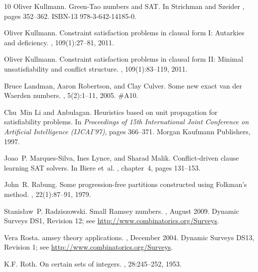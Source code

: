 \documentclass[final,3p,times]{elsarticle}
\theoremstyle{definition}
\begin{document}
\begin{thebibliography}{10}
Oliver Kullmann.
\newblock Green-{T}ao numbers and {SAT}.
\newblock In Strichman and Szeider \cite{Edinburgh2010}, pages 352--362.
\newblock ISBN-13 978-3-642-14185-0.

Oliver Kullmann.
\newblock Constraint satisfaction problems in clausal form {I}: Autarkies and
  deficiency.
, 109(1):27--81, 2011.

Oliver Kullmann.
\newblock Constraint satisfaction problems in clausal form {II}: Minimal
  unsatisfiability and conflict structure.
, 109(1):83--119, 2011.

Bruce Landman, Aaron Robertson, and Clay Culver.
\newblock Some new exact van der {Waerden} numbers.
,
  5(2):1--11, 2005.
\newblock \#{}A10.

Chu~Min Li and Anbulagan.
\newblock Heuristics based on unit propagation for satisfiability problems.
\newblock In {\em Proceedings of 15th International Joint Conference on
  Artificial Intelligence (IJCAI'97)}, pages 366--371. Morgan Kaufmann
  Publishers, 1997.

Joao~P. Marques-Silva, Ines Lynce, and Sharad Malik.
\newblock Conflict-driven clause learning {SAT} solvers.
\newblock In Biere et~al. \cite{2008HandbuchSAT}, chapter~4, pages 131--153.

John~R. Rabung.
\newblock Some progression-free partitions constructed using {F}olkman's
  method.
, 22(1):87--91, 1979.

Stanis{\l}aw~P. Radziszowski.
\newblock Small {R}amsey numbers.
, August 2009.
\newblock Dynamic Surveys DS1, Revision 12; see
  \url{http://www.combinatorics.org/Surveys}.

Vera Rosta.
amsey theory applications.
, December 2004.
\newblock Dynamic Surveys DS13, Revision 1; see
  \url{http://www.combinatorics.org/Surveys}.

K.F. Roth.
\newblock On certain sets of integers.
, 28:245--252, 1953.


\end{thebibliography}
\end{document}
